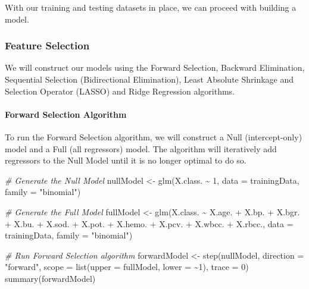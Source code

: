 \documentclass[
]{article}
\newenvironment{Shaded}{\begin{snugshade}}{\end{snugshade}}
\newcommand{\AttributeTok}[1]{\textcolor[rgb]{0.77,0.63,0.00}{#1}}
\newcommand{\CommentTok}[1]{\textcolor[rgb]{0.56,0.35,0.01}{\textit{#1}}}
\newcommand{\DecValTok}[1]{\textcolor[rgb]{0.00,0.00,0.81}{#1}}
\newcommand{\FunctionTok}[1]{\textcolor[rgb]{0.00,0.00,0.00}{#1}}
\newcommand{\NormalTok}[1]{#1}
\newcommand{\OtherTok}[1]{\textcolor[rgb]{0.56,0.35,0.01}{#1}}
\newcommand{\SpecialCharTok}[1]{\textcolor[rgb]{0.00,0.00,0.00}{#1}}
\newcommand{\StringTok}[1]{\textcolor[rgb]{0.31,0.60,0.02}{#1}}
\begin{document}
With our training and testing datasets in place, we can proceed with
building a model.

\hypertarget{feature-selection}{%
\subsubsection{Feature Selection}\label{feature-selection}}

We will construct our models using the Forward Selection, Backward
Elimination, Sequential Selection (Bidirectional Elimination), Least
Absolute Shrinkage and Selection Operator (LASSO) and Ridge Regression
algorithms.

\hypertarget{forward-selection-algorithm}{%
\paragraph{Forward Selection
Algorithm}\label{forward-selection-algorithm}}

To run the Forward Selection algorithm, we will construct a Null
(intercept-only) model and a Full (all regressors) model. The algorithm
will iteratively add regressors to the Null Model until it is no longer
optimal to do so.

\begin{Shaded}
\begin{Highlighting}[]
\CommentTok{\# Generate the Null Model}
\NormalTok{nullModel }\OtherTok{\textless{}{-}} \FunctionTok{glm}\NormalTok{(X.class. }\SpecialCharTok{\textasciitilde{}} \DecValTok{1}\NormalTok{, }\AttributeTok{data =}\NormalTok{ trainingData, }\AttributeTok{family =} \StringTok{"binomial"}\NormalTok{)}

\CommentTok{\# Generate the Full Model}
\NormalTok{fullModel }\OtherTok{\textless{}{-}} \FunctionTok{glm}\NormalTok{(X.class. }\SpecialCharTok{\textasciitilde{}}\NormalTok{ X.age. }\SpecialCharTok{+}\NormalTok{ X.bp. }\SpecialCharTok{+}\NormalTok{ X.bgr. }\SpecialCharTok{+}\NormalTok{ X.bu. }\SpecialCharTok{+}\NormalTok{ X.sod. }\SpecialCharTok{+}\NormalTok{ X.pot. }\SpecialCharTok{+} 
\NormalTok{    X.hemo. }\SpecialCharTok{+}\NormalTok{ X.pcv. }\SpecialCharTok{+}\NormalTok{ X.wbcc. }\SpecialCharTok{+}\NormalTok{ X.rbcc., }\AttributeTok{data =}\NormalTok{ trainingData, }
        \AttributeTok{family =} \StringTok{"binomial"}\NormalTok{)}

\CommentTok{\# Run Forward Selection algorithm}
\NormalTok{forwardModel }\OtherTok{\textless{}{-}} \FunctionTok{step}\NormalTok{(nullModel, }\AttributeTok{direction =} \StringTok{"forward"}\NormalTok{, }
    \AttributeTok{scope =} \FunctionTok{list}\NormalTok{(}\AttributeTok{upper =}\NormalTok{ fullModel, }\AttributeTok{lower =} \SpecialCharTok{\textasciitilde{}}\DecValTok{1}\NormalTok{), }\AttributeTok{trace =} \DecValTok{0}\NormalTok{)}
\FunctionTok{summary}\NormalTok{(forwardModel)}
\end{Highlighting}
\end{Shaded}
\end{document}
